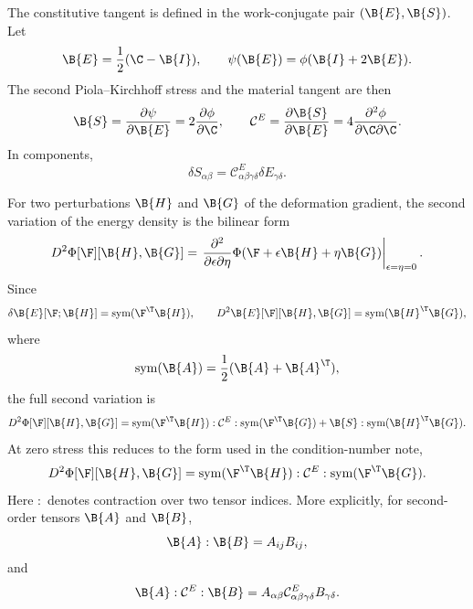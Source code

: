 The constitutive tangent is defined in the work-conjugate pair
$(\B{E},\B{S})$. Let
\begin{equation}
    \B{E} = \frac{1}{2}(\C-\B{I}),
    \qquad
    \psi(\B{E})=\phi(\B{I}+2\B{E}) .
\end{equation}
The second Piola--Kirchhoff stress and the material tangent are then
\begin{equation}
    \B{S}
    =
    \frac{\partial\psi}{\partial\B{E}}
    =
    2\frac{\partial\phi}{\partial\C},
    \qquad
    \mathcal{C}^{E}
    =
    \frac{\partial\B{S}}{\partial\B{E}}
    =
    4\frac{\partial^2\phi}{\partial\C\partial\C}.
\end{equation}
In components,
\begin{equation}
    \delta S_{\alpha\beta}
    =
    \mathcal{C}^{E}_{\alpha\beta\gamma\delta}
    \delta E_{\gamma\delta}.
\end{equation}

For two perturbations $\B{H}$ and $\B{G}$ of the deformation gradient, the
second variation of the energy density is the bilinear form
\begin{equation}
    D^2\Phi[\F][\B{H},\B{G}]
    =
    \left.
    \frac{\partial^2}{\partial \epsilon \partial \eta}
    \Phi(\F+\epsilon\B{H}+\eta\B{G})
    \right|_{\epsilon=\eta=0}.
\end{equation}
Since
\begin{equation}
    \delta\B{E}[\F;\B{H}]
    =
    \mathrm{sym}(\F^\T\B{H}),
    \qquad
    D^2\B{E}[\F][\B{H},\B{G}]
    =
    \mathrm{sym}(\B{H}^{\T}\B{G}),
\end{equation}
where
\begin{equation}
    \mathrm{sym}(\B{A})
    =
    \frac{1}{2}(\B{A}+\B{A}^{\T}),
\end{equation}
the full second variation is
\begin{equation}
    D^2\Phi[\F][\B{H},\B{G}]
    =
    \mathrm{sym}(\F^\T\B{H})
    :
    \mathcal{C}^{E}
    :
    \mathrm{sym}(\F^\T\B{G})
    +
    \B{S}
    :
    \mathrm{sym}(\B{H}^{\T}\B{G}).
    \label{eq:second_variation_finite_stress}
\end{equation}
At zero stress this reduces to the form used in the condition-number note,
\begin{equation}
    D^2\Phi[\F][\B{H},\B{G}]
    =
    \mathrm{sym}(\F^\T\B{H})
    :
    \mathcal{C}^{E}
    :
    \mathrm{sym}(\F^\T\B{G}).
    \label{eq:second_variation_zero_stress}
\end{equation}
Here $:$ denotes contraction over two tensor indices. More explicitly, for
second-order tensors $\B{A}$ and $\B{B}$,
\begin{equation}
    \B{A}:\B{B}=A_{ij}B_{ij},
\end{equation}
and
\begin{equation}
    \B{A}:\mathcal{C}^{E}:\B{B}
    =
    A_{\alpha\beta}
    \mathcal{C}^{E}_{\alpha\beta\gamma\delta}
    B_{\gamma\delta}.
\end{equation}

